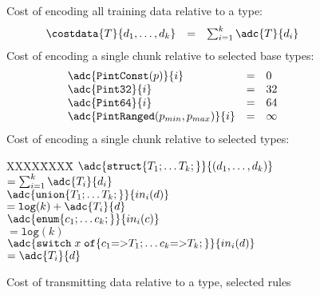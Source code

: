\begin{figure}
Cost of encoding all training data relative to a type:
\[
\begin{array}{@{}lcl}
\costdata{T}{d_1,\ldots,d_k} &=& \sum_{i=1}^{k} \adc{T}{d_i} \\
\end{array}
\]
Cost of encoding a single chunk relative to selected base types:
\[
\begin{array}{@{}lcl}
\adc{\mathtt{PintConst}(p)}{i}      &=& 0 \\
\adc{\mathtt{Pint32}}{i}            &=& 32 \\
\adc{\mathtt{Pint64}}{i}            &=& 64 \\
\adc{\mathtt{PintRanged}(p_{min},p_{max})}{i} &=& \infty \\
\end{array}
\]
Cost of encoding a single chunk relative to selected types:

\begin{tabbing}
XXXX\=XXXX\=\+\kill
$\adc{\mathtt{struct \{} T_1;\ldots T_k; \mathtt{\}}}{(d_1,\ldots,d_k)}$ \\
  \> $= \sum_{i=1}^{k} \adc{T_i}{d_i}$ \\[1.5ex] 
$\adc{\mathtt{union \{} T_1;\ldots T_k; \mathtt{\}}}{in_i(d)}$ \\            
  \> $= \mathtt{log}(k) + \adc{T_i}{d}$ \\[1.5ex]
$\adc{\mathtt{enum \{} c_1;\ldots c_k; \mathtt{\}}}{in_i(c)}$ \\            
  \> $= \mathtt{log}(k)$ \vspace{3pt} \\[1.5ex]
$\adc{
\mathtt{switch}\; x \; 
  \mathtt{of \{} 
    c_1 \mathtt{=>} T_1; \ldots  
    c_k \mathtt{=>} T_k; 
  \mathtt{\}}
}{in_i(d)}$ \\ 
  \> $= \adc{T_i}{d}$ 
\end{tabbing}
\caption {Cost of transmitting data relative to a type, selected rules}
\label{fig:cost-data}
\end{figure}